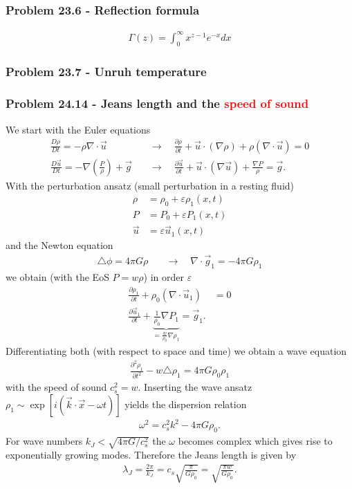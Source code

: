\documentclass[10pt,a4paper]{book}
\theoremstyle{definition}
\begin{document}
\subsubsection{Problem 23.6 - Reflection formula}
\begin{align}
    \Gamma(z)=\int_0^\infty x^{z-1}e^{-x}dx
\end{align}



\subsubsection{Problem 23.7 - Unruh temperature}

\subsubsection{Problem 24.14 - Jeans length and the \textcolor{red}{speed of sound}}
We start with the Euler equations
\begin{align}
    \frac{D\rho}{Dt}=-\rho\nabla\cdot\vec{u}\quad&\rightarrow\quad\frac{\partial\rho}{\partial t}+\vec{u}\cdot(\nabla\rho)+\rho(\nabla\cdot\vec{u})=0\\
    \frac{D\vec{u}}{Dt}=-\nabla\left(\frac{P}{\rho}\right)+\vec{g}\quad&\rightarrow\quad\frac{\partial\vec{u}}{\partial t}+\vec{u}\cdot(\nabla\vec{u})+\frac{\nabla P}{\rho}=\vec{g}.
\end{align}
With the perturbation ansatz (small perturbation in a resting fluid)
\begin{align}
    \rho&=\rho_0+\varepsilon \rho_1(x,t)\\
    P&=P_0+\varepsilon P_1(x,t)\\
    \vec{u}&=\varepsilon \vec{u}_1(x,t)
\end{align}
and the Newton equation
\begin{align}
    \triangle\phi=4\pi G\rho\quad&\rightarrow\quad\nabla\cdot\vec{g}_1=-4\pi G\rho_1
\end{align}
we obtain (with the EoS $P=w\rho$) in order $\varepsilon$
\begin{align}
    \frac{\partial\rho_1}{\partial t}+\rho_0(\nabla\cdot\vec{u}_1)&=0\\
    \frac{\partial\vec{u}_1}{\partial t}+\underbrace{\frac{1}{\rho_0}\nabla P_1}_{=\frac{w}{\rho_0}\nabla\rho_1}=\vec{g}_1.
\end{align}
Differentiating both (with respect to space and time) we obtain a wave equation
\begin{align}
    \frac{\partial^2\rho_1}{\partial t^2}-w\triangle\rho_1=4\pi G\rho_0\rho_1
\end{align}
with the speed of sound $c_s^2=w$. Inserting the wave ansatz $\rho_1\sim\exp[i(\vec{k}\cdot\vec{x}-\omega t)]$ yields the dispersion relation
\begin{align}
    \omega^2=c_s^2k^2-4\pi G\rho_0.
\end{align}
For wave numbers $k_J<\sqrt{4\pi G/c_s^2}$ the $\omega$ becomes complex which gives rise to exponentially growing modes. Therefore the Jeans length is given by
\begin{align}
    \lambda_J=\frac{2\pi}{k_J}=c_s\sqrt{\frac{\pi}{G\rho_0}}=\sqrt{\frac{\pi w}{G\rho_0}}.
\end{align}
\end{document}
